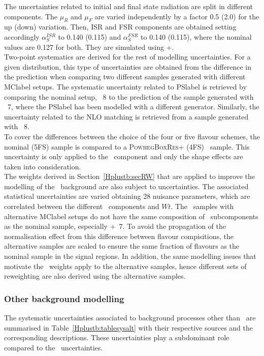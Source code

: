 The uncertainties related to initial and final state radiation are split in different components. The $\mu_R$ and $\mu_F$ are varied independently by a factor 0.5 (2.0) for the up (down) variation. Then, ISR and FSR components are obtained setting accordingly $\alpha_S^{ISR}$ to 0.140 (0.115) and $\alpha_S^{FSR}$ to 0.140 (0.115), where the nominal values are 0.127 for both. They are simulated using \POWHEGBOX+\PYTHIA.\\

Two-point systematics are derived for the rest of modelling uncertainties. For a given distribution, this type of uncertainties are obtained from the difference in the prediction when comparing two different samples generated with different \acrshort{MClabel} setups. The systematic uncertainty related to \acrshort{PSlabel} is retrieved by comparing the nominal setup, \POWHEGPYTHIA~8 to the prediction of the sample generated with \POWHEGHERWIG~7, where the \acrshort{PSlabel} has been modelled with a different generator. Similarly, the uncertainty related to the NLO matching is retrieved from a sample generated with \MGMCatNLOPYTHIA~8.\\

To cover the differences between the choice of the four or five flavour schemes, the nominal (5FS) sample is compared to a \textsc{PowhegBoxRes}+ (4FS) \ttb\ sample. This uncertainty is only applied to the \ttb\ component and only the shape effects are taken into consideration.\\

The weights derived in Section~\ref{Hplustb:secRW} that are applied to improve the modelling of the \ttbar\ background are also subject to uncertainties. The associated statistical uncertainties are varied obtaining 28 nuisance parameters, which are correlated between the different \ttbar\ components and $Wt$. The \ttbar\ samples with alternative \acrshort{MClabel} setups do not have the same composition of \ttbar\ subcomponents as the nominal sample, especially \POWHEGBOX+\HERWIG~7. To avoid the propagation of the normalisation effect from this difference between flavour compisitions, the alternative samples are scaled to ensure the same fraction of flavours as the nominal sample in the signal regions. In addition, the same modelling issues that motivate the \ttbar\ weights apply to the alternative samples, hence different sets of reweighting are also derived using the alternative samples.\\

\subsubsection{Other background modelling}
The systematic uncertainties associated to background processes other than \ttjets\ are summarised in Table~\ref{Hplustb:tablesysalt} with their respective sources and the corresponding descriptions. These uncertainties play a subdominant role compared to the \ttbar\ uncertainties.\\

